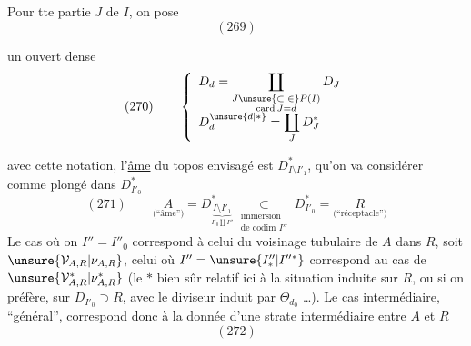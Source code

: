 Pour tte partie $J$ de $I$, on pose
\[
(269)
\]

un ouvert dense
\[
(270)\qquad\left\{\begin{array}{l}
D_d=\displaystyle\coprod_{\substack{J\unsure{\subset|\in}P(I)\\\operatorname{card}J=d}}D_J\\
D_d^{\unsure{d|*}}=\displaystyle\coprod_JD_J^*
\end{array}\right.
\]

avec cette notation, l'\uline{âme} du topos  envisagé est $D^*_{I\setminus I'_1}$, qu'on va considérer comme plongé dans $D^*_{I'_0}$
\[
(271)\qquad
\underset{\text{(``âme'')}}{A}=D^*_{\underbrace{I\setminus I'_1}_{I'_0\amalg I''}}
\underset{\substack{\text{immersion}\\\text{de codim }I''}}{\subset}
D^*_{I'_0}=\underset{\text{(``réceptacle'')}}{R}
\]
Le  cas où on  $I''=I''_0$ correspond à celui du voisinage tubulaire de  $A$ dans $R$, soit $\unsure{\mathcal V_{A,R}|\nu_{A,R}}$, celui où $I''=\unsure{I''_*|I''{}^*}$ correspond au cas de $\unsure{\mathcal V^*_{A,R}|\nu^*_{A,R}}$ (le $*$ bien sûr relatif ici à la situation induite sur $R$, ou si on préfère, sur $D_{I'_0}\supset R$, avec le diviseur induit par $\Theta_{d_0}$ \ldots). Le cas intermédiaire, ``général'', correspond donc à  la donnée d'une strate intermédiaire entre $A$ et $R$
\[
(272)
\]

